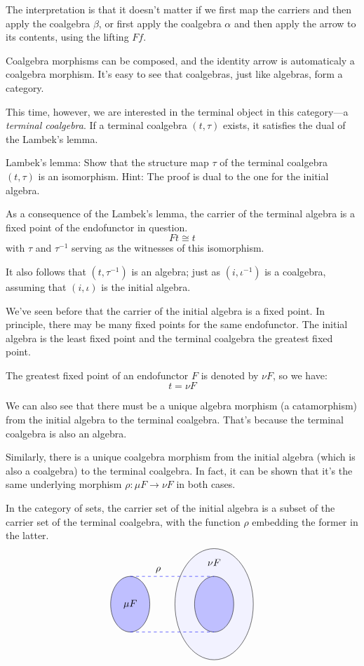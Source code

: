 \documentclass[DaoFP]{subfiles}
\begin{document}
The interpretation is that it doesn't matter if we first map the carriers and then apply the coalgebra $\beta$, or first apply the coalgebra $\alpha$ and then apply the arrow to its contents, using the lifting $F f$.

Coalgebra morphisms can be composed, and the identity arrow is automaticaly a coalgebra morphism. It's easy to see that coalgebras, just like algebras, form a category. 

This time, however, we are interested in the terminal object in this category---a \emph{terminal coalgebra}. If a terminal coalgebra $(t, \tau)$ exists, it satisfies the dual of the Lambek's lemma. 

\begin{exercise}{Lambek's lemma:}
Show that the structure map $\tau$ of the terminal coalgebra $(t, \tau)$ is an isomorphism. Hint: The proof is dual to the one for the initial algebra.
\end{exercise}

As a consequence of the Lambek's lemma, the carrier of the terminal algebra is a fixed point of the endofunctor in question. 
\[ F t \cong t \]
with $\tau$ and $\tau^{-1}$ serving as the witnesses of this isomorphism. 

It also follows that $(t, \tau^{-1})$ is an algebra; just as  $(i, \iota^{-1})$ is a coalgebra, assuming that $(i, \iota)$ is the initial algebra.

We've seen before that the carrier of the initial algebra is a fixed point. In principle, there may be many fixed points for the same endofunctor. The initial algebra is the least fixed point and the terminal coalgebra the greatest fixed point. 

The greatest fixed point of an endofunctor $F$ is denoted by $\nu F$, so we have:
\[ t = \nu F \]

We can also see that there must be a unique algebra morphism (a catamorphism) from the initial algebra to the terminal coalgebra. That's because the terminal coalgebra is also an algebra. 

Similarly, there is a unique coalgebra morphism from the initial algebra (which is also a coalgebra) to the terminal coalgebra. In fact, it can be shown that it's the same underlying morphism $\rho \colon \mu F \to \nu F$ in both cases. 

In the category of sets, the carrier set of the initial algebra is a subset of the carrier set of the terminal coalgebra, with the function $\rho$ embedding the former in the latter. 
\[
\begin{tikzpicture}
         \draw (-1,0)[fill=blue!25!white] ellipse (0.7 and 1);
         \draw (2,0)[fill=blue!5!white] ellipse (1.4 and 2);
         \draw (2,0)[fill=blue!25!white] ellipse (0.7 and 1);
         \node[above] at (0, 1) {$\rho$};
       	\draw[dashed, blue] (-1, 1) -- (2, 1);
	\draw[dashed, blue] (-1, -1) -- (2, -1);
        \node at (-1, 0) { $\mu F$ };
        \node at (2, 1.5) { $\nu F$ };
\end{tikzpicture}
\]
\end{document}
